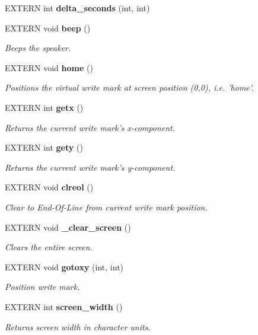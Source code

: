 \begin{CompactItemize}
EXTERN int {\bf delta\_\-seconds} (int, int)
\item 
EXTERN void {\bf beep} ()
\begin{CompactList}\small\item\em Beeps the speaker.\item\end{CompactList}\item 
EXTERN void {\bf home} ()
\begin{CompactList}\small\item\em Positions the virtual write mark at screen position (0,0), i.e. 'home'.\item\end{CompactList}\item 
EXTERN int {\bf getx} ()
\begin{CompactList}\small\item\em Returns the current write mark's x-component.\item\end{CompactList}\item 
EXTERN int {\bf gety} ()
\begin{CompactList}\small\item\em Returns the current write mark's y-component.\item\end{CompactList}\item 
EXTERN void {\bf clreol} ()
\begin{CompactList}\small\item\em Clear to End-Of-Line from current write mark position.\item\end{CompactList}\item 
EXTERN void {\bf \_\-clear\_\-screen} ()
\begin{CompactList}\small\item\em Clears the entire screen.\item\end{CompactList}\item 
EXTERN void {\bf gotoxy} (int, int)
\begin{CompactList}\small\item\em Position write mark.\item\end{CompactList}\item 
EXTERN int {\bf screen\_\-width} ()
\begin{CompactList}\small\item\em Returns screen width in character units.\item\end{CompactList}\item 

\end{CompactItemize}
